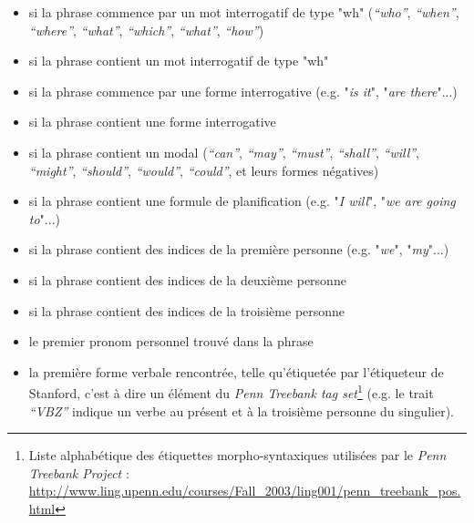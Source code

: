 \begin{itemize}
	\item[\bullet] si la phrase commence par un mot interrogatif de type "wh" (\textit{``who''}, \textit{``when''}, \textit{``where''}, \textit{``what''}, \textit{``which''}, \textit{``what''}, \textit{``how''})
	\item[\bullet] si la phrase contient un mot interrogatif de type "wh"
	\item[\bullet] si la phrase commence par une forme interrogative (e.g. "\textit{is it}", "\textit{are there}"...)
	\item[\bullet] si la phrase contient une forme interrogative
	\item[\bullet] si la phrase contient un modal (\textit{``can''}, \textit{``may''}, \textit{``must''}, \textit{``shall''}, \textit{``will''}, \textit{``might''}, \textit{``should''}, \textit{``would''}, \textit{``could''}, et leurs formes négatives)
	\item[\bullet] si la phrase contient une formule de planification (e.g. "\textit{I will}", "\textit{we are going to}"...)
	\item[\bullet] si la phrase contient des indices de la première personne (e.g. "\textit{we}", "\textit{my}"...)
	\item[\bullet] si la phrase contient des indices de la deuxième personne
	\item[\bullet] si la phrase contient des indices de la troisième personne
	\item[\bullet] le premier pronom personnel trouvé dans la phrase
	\item[\bullet] la première forme verbale rencontrée, telle qu'étiquetée par l'étiqueteur de Stanford, c'est à dire un élément du \textit{Penn Treebank tag set}\footnote{Liste alphabétique des étiquettes morpho-syntaxiques utilisées par le \textit{Penn Treebank Project} : \url{http://www.ling.upenn.edu/courses/Fall_2003/ling001/penn_treebank_pos.html}} (e.g. le trait \textit{``VBZ''} indique un verbe au présent et à la troisième personne du singulier).
\end{itemize}

